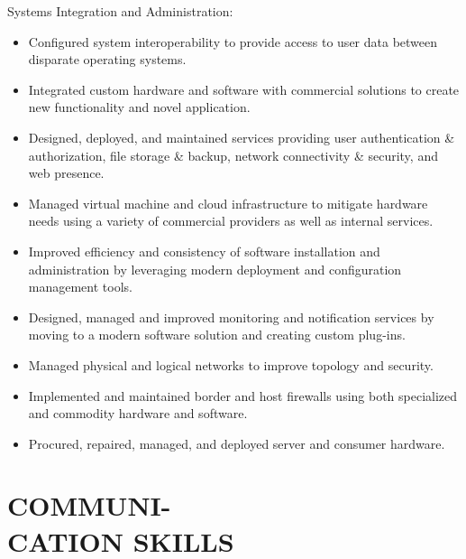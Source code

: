\documentclass[line,margin]{res}
\begin{document}
\begin{resume}
    Systems Integration and Administration:
    \vspace{1 mm}
    \begin{itemize}
        \item Configured system interoperability to provide access to user
            data between disparate operating systems.
        \item Integrated custom hardware and software with commercial
            solutions to create new functionality and novel application.
        \item Designed, deployed, and maintained services providing
            user authentication \& authorization, file storage \& backup,
            network connectivity \& security, and web presence.
        \item Managed virtual machine and cloud infrastructure to mitigate
            hardware needs using a variety of commercial providers as well
            as internal services.
        \item Improved efficiency and consistency of software installation
            and administration by leveraging modern deployment and
            configuration management tools.
        \item Designed, managed and improved monitoring and notification
            services by moving to a modern software solution and creating
            custom plug-ins.
        \item Managed physical and logical networks to improve topology
            and security.
        \item Implemented and maintained border and host firewalls using
            both specialized and commodity hardware and software.
        \item Procured, repaired, managed, and deployed server and
            consumer hardware.
    \end{itemize}

\section{COMMUNI- \\ CATION SKILLS}


\end{resume}
\end{document}
